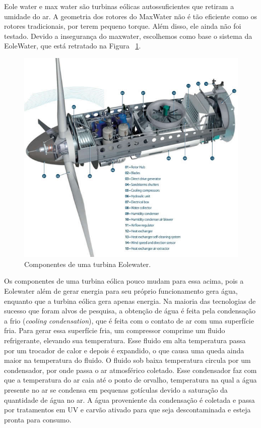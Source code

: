 Eole water e max water são turbinas eólicas autossuficientes que retiram a umidade do ar. A geometria dos rotores do MaxWater não é tão eficiente como os rotores tradicionais, por terem pequeno torque. Além disso, ele ainda não foi testado. Devido a insegurança do maxwater, escolhemos como base o sistema da EoleWater, que está retratado na Figura ~\ref{Eole_Water}.

\begin{figure}[!htbp]
\centering
\includegraphics[scale=0.6]{editaveis/figuras/Componentes}
\caption[Componentes de uma turbina Eolewater.]{Componentes de uma turbina Eolewater.\footnotemark}
\FloatBarrier
\label{Eole_Water}
\end{figure}


Os componentes de uma turbina eólica pouco mudam para essa acima, pois a Eolewater além de gerar energia para seu próprio
funcionamento gera água, enquanto que a turbina eólica gera apenas energia. Na maioria das tecnologias de sucesso que foram alvos de pesquisa,
a obtenção de água é feita pela condensação  a frio (\textit{cooling condensation}), que é feita com o contato de 
ar com uma superfície fria. Para gerar essa superfície fria, um compressor comprime um fluido refrigerante, elevando sua
temperatura. Esse fluido em alta temperatura passa por um trocador de calor e depois é expandido, o que causa uma queda 
ainda maior na temperatura do fluido. O fluido sob baixa temperatura circula por um condensador, por onde passa o ar 
atmosférico coletado. Esse condensador faz com que a temperatura do ar caia até o ponto de orvalho, temperatura na qual a
água presente no ar se condensa em pequenas gotículas devido a saturação da quantidade de água no ar. A água proveniente
da condensação é coletada e passa por tratamentos em UV e carvão ativado para que seja descontaminada e esteja pronta para
consumo.




